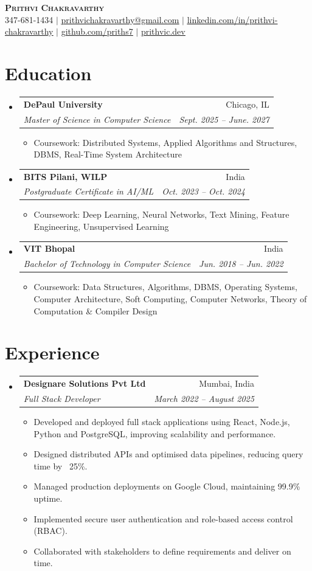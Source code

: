 \documentclass[letterpaper,11pt]{article}
\makeatletter
\newcommand{\resumeItem}[1]{
  \item\small{
    {#1 \vspace{-2pt}}
  }
}
\newcommand{\resumeSubheading}[4]{
  \vspace{-2pt}\item
    \begin{tabular*}{0.97\textwidth}[t]{l@{\extracolsep{\fill}}r}
      \textbf{#1} & #2 \\
      \textit{\small#3} & \textit{\small #4} \\
    \end{tabular*}\vspace{-2pt}
}
\newcommand{\resumeSubHeadingListStart}{\begin{itemize}[leftmargin=0.15in, label={}]}
\newcommand{\resumeSubHeadingListEnd}{\end{itemize}}
\newcommand{\resumeItemListStart}{\begin{itemize}}
\newcommand{\resumeItemListEnd}{\end{itemize}\vspace{-5pt}}
\makeatother
\begin{document}
\begin{center}
    \textbf{\Huge \scshape Prithvi Chakravarthy} \\ \vspace{1pt}
    \small 347-681-1434 $|$ \href{mailto:prithvichakravarthy@gmail.com}{\underline{prithvichakravarthy@gmail.com}} $|$ 
    \href{https://www.linkedin.com/in/prithvi-chakravarthy/}{\underline{linkedin.com/in/prithvi-chakravarthy}} $|$
    \href{https://github.com/priths7}{\underline{github.com/priths7}} $|$
    \href{https://www.prithvic.dev/}{\underline{prithvic.dev}}
\end{center}

\section{Education}
  \resumeSubHeadingListStart
    \resumeSubheading
      {DePaul University}{Chicago, IL}
      {Master of Science in Computer Science}{Sept. 2025 -- June. 2027} 
      \resumeItemListStart
        \resumeItem{Coursework: Distributed Systems, Applied Algorithms and Structures, DBMS, Real-Time System Architecture}
      \resumeItemListEnd
      
    \resumeSubheading
      {BITS Pilani, WILP}{India}
      {Postgraduate Certificate in AI/ML}{Oct. 2023 -- Oct. 2024} 
      \resumeItemListStart
        \resumeItem{Coursework: Deep Learning, Neural Networks, Text Mining, Feature Engineering, Unsupervised Learning}
      \resumeItemListEnd

    \resumeSubheading
      {VIT Bhopal}{India}
      {Bachelor of Technology in Computer Science}{Jun. 2018 -- Jun. 2022}
      \resumeItemListStart
        \resumeItem{Coursework: Data Structures, Algorithms, DBMS, Operating Systems, Computer Architecture, Soft Computing, Computer Networks, Theory of Computation \& Compiler Design}
      \resumeItemListEnd
  \resumeSubHeadingListEnd

\section{Experience}
  \resumeSubHeadingListStart
    \resumeSubheading
      {Designare Solutions Pvt Ltd}{Mumbai, India}
      {Full Stack Developer}{March 2022 -- August 2025} 
      \resumeItemListStart
        \resumeItem{Developed and deployed full stack applications using React, Node.js, Python and PostgreSQL, improving scalability and performance.}
        \resumeItem{Designed distributed APIs and optimised data pipelines, reducing query time by ~25\%.}
        \resumeItem{Managed production deployments on Google Cloud, maintaining 99.9\% uptime.} 
        \resumeItem{Implemented secure user authentication and role-based access control (RBAC).}
        \resumeItem{Collaborated with stakeholders to define requirements and deliver on time.}
      \resumeItemListEnd
  \resumeSubHeadingListEnd
\end{document}
